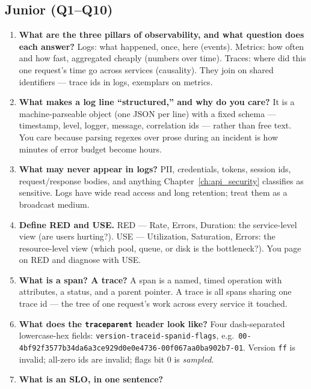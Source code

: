 \subsection*{Junior (Q1--Q10)}
\begin{enumerate}[label=\textbf{Q\arabic*.}, leftmargin=1.6cm]
  \item \textbf{What are the three pillars of observability, and what
        question does each answer?}
        Logs: what happened, once, here (events). Metrics: how often and
        how fast, aggregated cheaply (numbers over time). Traces: where did
        this one request's time go across services (causality). They join
        on shared identifiers --- trace ids in logs, exemplars on metrics.
  \item \textbf{What makes a log line ``structured,'' and why do you care?}
        It is a machine-parseable object (one JSON per line) with a fixed
        schema --- timestamp, level, logger, message, correlation ids ---
        rather than free text. You care because parsing regexes over prose
        during an incident is how minutes of error budget become hours.
  \item \textbf{What may never appear in logs?}
        PII, credentials, tokens, session ids, request/response bodies, and
        anything Chapter~\ref{ch:api_security} classifies as sensitive.
        Logs have wide read access and long retention; treat them as a
        broadcast medium.
  \item \textbf{Define RED and USE.}
        RED --- Rate, Errors, Duration: the service-level view (are users
        hurting?). USE --- Utilization, Saturation, Errors: the
        resource-level view (which pool, queue, or disk is the
        bottleneck?). You page on RED and diagnose with USE.
  \item \textbf{What is a span? A trace?}
        A span is a named, timed operation with attributes, a status, and a
        parent pointer. A trace is all spans sharing one trace id --- the
        tree of one request's work across every service it touched.
  \item \textbf{What does the \texttt{traceparent} header look like?}
        Four dash-separated lowercase-hex fields:
        \texttt{version-traceid-spanid-flags}, e.g.\
        \texttt{00-4bf92f3577b34da6a3ce929d0e0e4736-00f067aa0ba902b7-01}.
        Version \texttt{ff} is invalid; all-zero ids are invalid; flags bit
        0 is \emph{sampled}.
  \item \textbf{What is an SLO, in one sentence?}

\end{enumerate}
